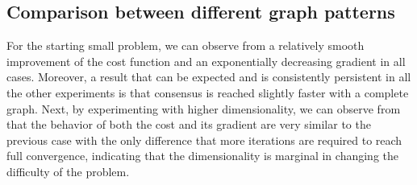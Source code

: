 \documentclass[a4paper,11pt,oneside]{book}
\begin{document}
\subsection{Comparison between different graph patterns}

For the starting small problem, we can observe from  a relatively smooth improvement of the cost function and an exponentially decreasing gradient in all cases. Moreover, a result that can be expected and is consistently persistent in all the other experiments is that consensus is reached slightly faster with a complete graph. Next, by experimenting with higher dimensionality, we can observe from  that the behavior of both the cost and its gradient are very similar to the previous case with the only difference that more iterations are required to reach full convergence, indicating that the dimensionality is marginal in changing the difficulty of the problem. 
\end{document}
